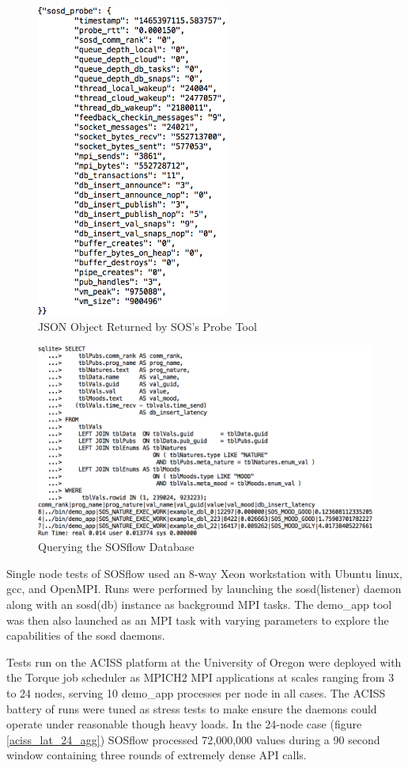 \begin{figure}[!t]
  \centering
  \includegraphics[width=2.5in]{images/probe_json_example.png}
  \caption{JSON Object Returned by SOS's Probe Tool}
  \label{probe_json}
\end{figure}

\begin{figure}[!t]
\centering
\includegraphics[width=5in]{images/query_example.png}
\caption{Querying the SOSflow Database}
\label{example query}
\end{figure}
Single node tests of SOSflow used an 8-way Xeon workstation with
Ubuntu linux, gcc, and OpenMPI. Runs were performed by launching the
sosd(listener) daemon along with an sosd(db) instance as background
MPI tasks.  The demo\_app tool was then also launched as an MPI task
with varying parameters to explore the capabilities of the sosd
daemons.

Tests run on the ACISS platform at the University of Oregon were
deployed with the Torque job scheduler as MPICH2 MPI applications at
scales ranging from 3 to 24 nodes, serving 10 demo\_app processes per
node in all cases. The ACISS battery of runs were tuned as stress
tests to make ensure the daemons could operate under reasonable though
heavy loads. In the 24-node case (figure \ref{aciss_lat_24_agg})
SOSflow processed 72,000,000 values during a 90 second window
containing three rounds of extremely dense API calls.

